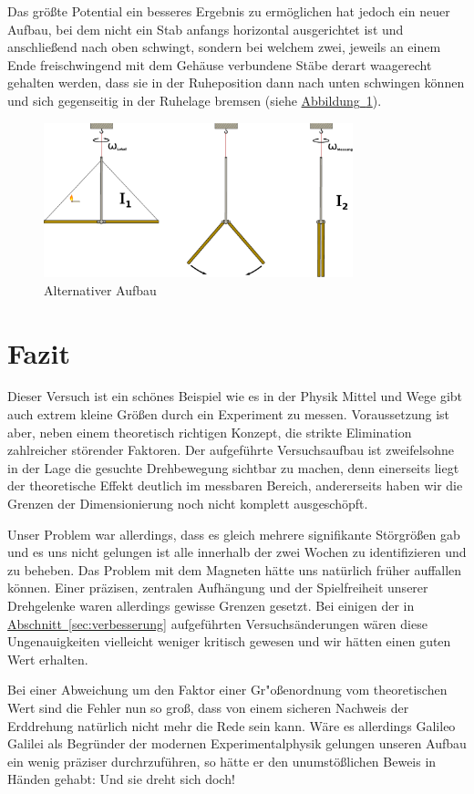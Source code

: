 \documentclass[11pt]{scrartcl}
\newcommand{\hypref}[2]{\hyperref[#2]{{#1}~\ref{#2}}}
\begin{document}
Das größte Potential ein besseres Ergebnis zu ermöglichen hat jedoch ein neuer Aufbau, bei dem nicht ein Stab anfangs horizontal ausgerichtet ist und anschließend nach oben schwingt, sondern bei welchem zwei, jeweils an einem Ende freischwingend mit dem Gehäuse verbundene Stäbe derart waagerecht gehalten werden, dass sie in der Ruheposition dann nach unten schwingen können und sich gegenseitig in der Ruhelage bremsen (siehe \hypref{Abbildung}{prinzip2}).

\begin{figure}[h]
\begin{center}
\includegraphics[width=0.8\textwidth]{prinzip-2.pdf}
\end{center}
\vspace{-1.5\baselineskip}
\caption{Alternativer Aufbau}
\label{prinzip2}
\end{figure}


\section{Fazit} %
Dieser Versuch ist ein schönes Beispiel wie es in der Physik Mittel und Wege gibt auch extrem kleine Größen durch ein Experiment zu messen.
Voraussetzung ist aber, neben einem theoretisch richtigen Konzept, die strikte Elimination zahlreicher störender Faktoren.
Der aufgeführte Versuchsaufbau ist zweifelsohne in der Lage die gesuchte Drehbewegung sichtbar zu machen, denn einerseits liegt der theoretische Effekt deutlich im messbaren Bereich, andererseits haben wir die Grenzen der Dimensionierung noch nicht komplett ausgeschöpft.

Unser Problem war allerdings, dass es gleich mehrere signifikante Störgrößen gab und es uns nicht gelungen ist alle innerhalb der zwei Wochen zu identifizieren und zu beheben.
Das Problem mit dem Magneten hätte uns natürlich früher auffallen können.
Einer präzisen, zentralen Aufhängung und der Spielfreiheit unserer Drehgelenke waren allerdings gewisse Grenzen gesetzt.
Bei einigen der in \hypref{Abschnitt}{sec:verbesserung} aufgeführten Versuchsänderungen wären diese Ungenauigkeiten vielleicht weniger kritisch gewesen und wir hätten einen guten Wert erhalten.

Bei einer Abweichung um den Faktor einer Gr"oßenordnung vom theoretischen Wert sind die Fehler nun so groß, dass von einem sicheren Nachweis der Erddrehung natürlich nicht mehr die Rede sein kann.
Wäre es allerdings Galileo Galilei als Begründer der modernen Experimentalphysik gelungen unseren Aufbau ein wenig präziser durchrzuführen, so hätte er den unumstößlichen Beweis in Händen gehabt:
Und sie dreht sich doch!
\end{document}
